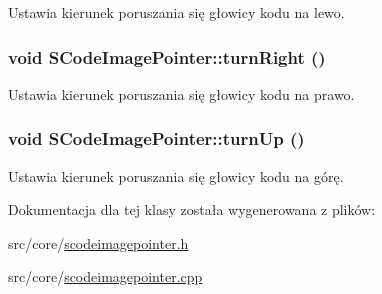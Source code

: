 Ustawia kierunek poruszania się głowicy kodu na lewo. \hypertarget{classSCodeImagePointer_352a2e1c0039812322ce48e183e246de}{
\subsubsection[{turnRight}]{\setlength{\rightskip}{0pt plus 5cm}void SCodeImagePointer::turnRight ()}}
\label{classSCodeImagePointer_352a2e1c0039812322ce48e183e246de}


Ustawia kierunek poruszania się głowicy kodu na prawo. \hypertarget{classSCodeImagePointer_01367459d424aa6155f98c8cd8b930d5}{
\subsubsection[{turnUp}]{\setlength{\rightskip}{0pt plus 5cm}void SCodeImagePointer::turnUp ()}}
\label{classSCodeImagePointer_01367459d424aa6155f98c8cd8b930d5}


Ustawia kierunek poruszania się głowicy kodu na górę. 

Dokumentacja dla tej klasy została wygenerowana z plików:\begin{CompactItemize}
\item 
src/core/\hyperlink{scodeimagepointer_8h}{scodeimagepointer.h}\item 
src/core/\hyperlink{scodeimagepointer_8cpp}{scodeimagepointer.cpp}\end{CompactItemize}
